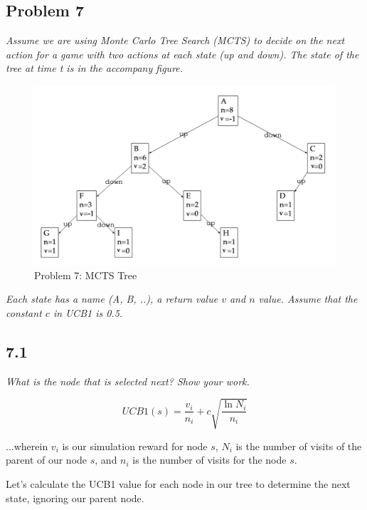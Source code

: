 \documentclass{article}
\begin{document}
\subsection*{Problem 7}

\textit{Assume we are using Monte Carlo Tree Search (MCTS) to decide on the next action for a game with two actions at each state (up and down). The state of the tree at time t is in the accompany figure.}


\begin{figure}
    \centering
    \includegraphics[width=.8\linewidth]{imgs/midterm.7.png}
    \caption{Problem 7: MCTS Tree}
\end{figure}

\textit{Each state has a name (A, B, ..), a return value $v$ and $n$ value. Assume that the constant $c$ in UCB1 is 0.5.}

\subsection*{7.1}

\textit{What is the node that is selected next? Show your work.}

\begin{equation}
    UCB1(s) = \frac{v_i}{n_i}+ c \sqrt{\frac{\ln{N_i}}{n_i}}
\end{equation}

...wherein $v_i$ is our simulation reward for node $s$, $N_i$ is the number of visits of the parent of our node $s$, and $n_i$ is the number of visits for the node $s$.

Let's calculate the UCB1 value for each node in our tree to determine the next state, ignoring our parent node.
\end{document}
